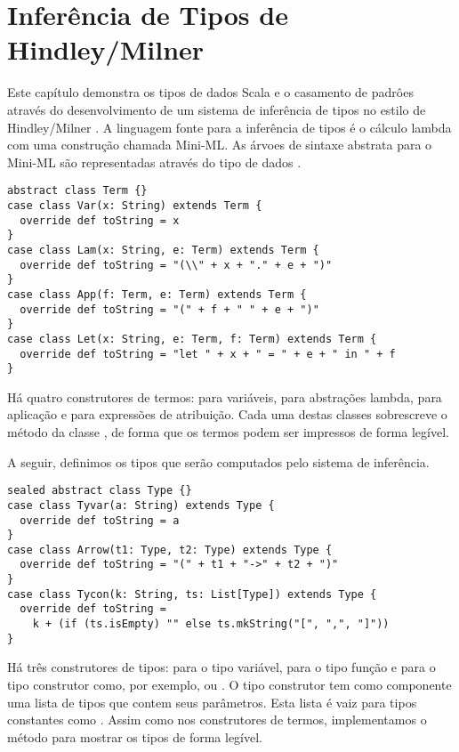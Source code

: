 \chapter{\label{sec:hm}Inferência de Tipos de Hindley/Milner}

Este capítulo demonstra os tipos de dados Scala e o casamento de padrôes através
do desenvolvimento de um sistema de inferência de tipos no estilo de Hindley/Milner
\cite{milner:polymorphism}. 
A linguagem fonte para a inferência de tipos é o cálculo lambda com uma construção
chamada Mini-ML. As árvoes de sintaxe abstrata para o Mini-ML 
são representadas através do tipo de dados .
\begin{lstlisting}
abstract class Term {}
case class Var(x: String) extends Term {
  override def toString = x
}
case class Lam(x: String, e: Term) extends Term {
  override def toString = "(\\" + x + "." + e + ")"
}
case class App(f: Term, e: Term) extends Term {
  override def toString = "(" + f + " " + e + ")"
}
case class Let(x: String, e: Term, f: Term) extends Term {
  override def toString = "let " + x + " = " + e + " in " + f
}
\end{lstlisting}
Há quatro construtores de termos:  para variáveis, 
para abstrações lambda,  para aplicação e
 para expressões de atribuição. Cada uma destas classes sobrescreve o método
 da classe , de forma que os termos podem ser impressos
de forma legível.

A seguir, definimos os tipos que serão computados pelo sistema de inferência.
\begin{lstlisting}
sealed abstract class Type {}
case class Tyvar(a: String) extends Type {
  override def toString = a
}
case class Arrow(t1: Type, t2: Type) extends Type {
  override def toString = "(" + t1 + "->" + t2 + ")"
}
case class Tycon(k: String, ts: List[Type]) extends Type {
  override def toString = 
    k + (if (ts.isEmpty) "" else ts.mkString("[", ",", "]"))
}
\end{lstlisting}
Há três construtores de tipos:  para o tipo variável,
  para o tipo função e    para o tipo construtor como,
por exemplo,  ou . O tipo construtor tem como
componente uma lista de tipos que contem seus parâmetros. Esta lista é
vaiz para tipos constantes como . Assim como nos construtores
de termos, implementamos o método  para mostrar os tipos de forma legível.

